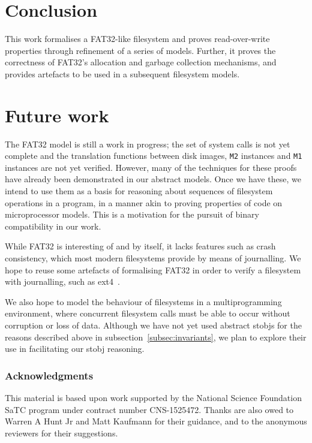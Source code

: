 \documentclass[submission,copyright,creativecommons]{eptcs}
\begin{document}


\section{Conclusion}

This work formalises a FAT32-like filesystem and proves
read-over-write properties through refinement of a series of
models. Further, it proves the correctness of FAT32's allocation and
garbage collection mechanisms, and provides artefacts to be used in a
subsequent filesystem models.

\section{Future work}

The FAT32 model is still a work in progress; the set of system calls
is not yet complete and the translation functions between disk images,
\texttt{M2} instances and \texttt{M1} instances are not yet
verified. However, many of the techniques for these proofs have
already been demonstrated in our abstract models. Once we have these,
we intend to use them as a basis for
reasoning about sequences of filesystem operations in a program, in a
manner akin to proving properties of code on microprocessor
models. This is a motivation for the pursuit of binary compatibility
in our work.

While FAT32 is interesting of and by itself, it lacks features such as
crash consistency, which most modern filesystems provide by means of
journalling. We hope to reuse some artefacts of formalising FAT32 in
order to verify a filesystem with journalling, such as
ext4~\cite{mathur2007new}.

We also hope to model the behaviour of filesystems in a
multiprogramming environment, where concurrent filesystem calls must
be able to occur without corruption or loss of data. Although we have
not yet used abstract stobjs for the reasons described
above in subsection~\ref{subsec:invariants}, we plan to explore their
use in facilitating our stobj reasoning.

\subsubsection*{Acknowledgments} This material is based upon work
supported by the National Science Foundation SaTC program under
contract number CNS-1525472. Thanks are also owed to Warren A Hunt
Jr and Matt Kaufmann for their guidance, and to the anonymous
reviewers for their suggestions.



\end{document}

